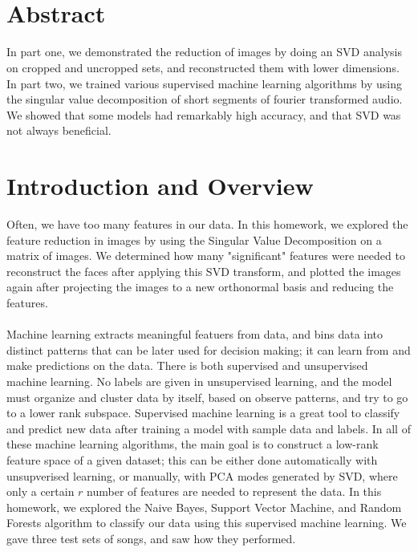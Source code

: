 \documentclass{article}
\title{
    \textmd{\textbf{\text{ } \hmwkTitle}}\\
}
\author{\hmwkAuthorName}
\date{}
\begin{document}
\maketitle

\section*{\fontsize{19}{15}\selectfont Abstract}
		In part one, we demonstrated the reduction of images by doing an SVD analysis on cropped and uncropped sets, and reconstructed them with lower dimensions. In part two, we trained various supervised machine learning algorithms by using the singular value decomposition of short segments of fourier transformed audio. We showed that some models had remarkably high accuracy, and that SVD was not always beneficial.
\section*{\fontsize{19}{15}\selectfont Introduction and Overview}
	Often, we have too many features in our data. In this homework, we explored the feature reduction in images by using the Singular Value Decomposition on a matrix of images. We determined how many "significant" features were needed to reconstruct the faces after applying this SVD transform, and plotted the images again after projecting the images to a new orthonormal basis and reducing the features. \\ \\
	Machine learning extracts meaningful featuers from data, and bins data into distinct patterns that can be later used for decision making; it can learn from and make predictions on the data. There is both supervised and unsupervised machine learning. No labels are given in unsupervised learning, and the model must organize and cluster data by itself, based on observe patterns, and try to go to a lower rank subspace.  Supervised machine learning is a great tool to classify and predict new data after training a model with sample data and labels. In all of these machine learning algorithms, the main goal is to construct a low-rank feature space of a given dataset; this can be either done automatically with unsupverised learning, or manually, with PCA modes generated by SVD, where only a certain $r$ number of features are needed to represent the data. In this homework, we explored the Naive Bayes, Support Vector Machine, and Random Forests algorithm to classify our data using this supervised machine learning. We gave three test sets of songs, and saw how they performed.
\end{document}
